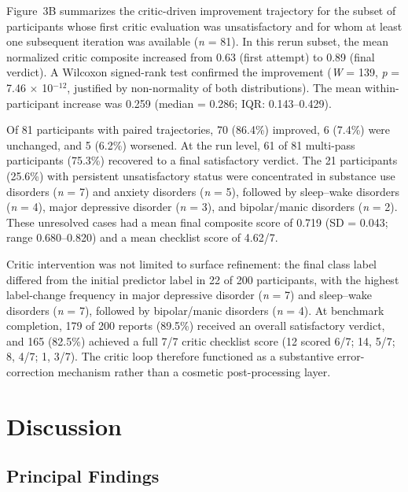 \documentclass[11pt,a4paper,twoside]{article}
\newcommand{\FloatBarrier}{\par}
\begin{document}
Figure~3B summarizes the critic-driven improvement trajectory for the subset of participants whose first critic evaluation was unsatisfactory and for whom at least one subsequent iteration was available (\textit{n} = 81). In this rerun subset, the mean normalized critic composite increased from 0.63 (first attempt) to 0.89 (final verdict). A Wilcoxon signed-rank test confirmed the improvement (\textit{W} = 139, \textit{p} = 7.46 $\times$ 10$^{-12}$, justified by non-normality of both distributions). The mean within-participant increase was 0.259 (median = 0.286; IQR: 0.143--0.429).

Of 81 participants with paired trajectories, 70 (86.4\%) improved, 6 (7.4\%) were unchanged, and 5 (6.2\%) worsened. At the run level, 61 of 81 multi-pass participants (75.3\%) recovered to a final satisfactory verdict. The 21 participants (25.6\%) with persistent unsatisfactory status were concentrated in substance use disorders (\textit{n} = 7) and anxiety disorders (\textit{n} = 5), followed by sleep--wake disorders (\textit{n} = 4), major depressive disorder (\textit{n} = 3), and bipolar/manic disorders (\textit{n} = 2). These unresolved cases had a mean final composite score of 0.719 (SD = 0.043; range 0.680--0.820) and a mean checklist score of 4.62/7.

Critic intervention was not limited to surface refinement: the final class label differed from the initial predictor label in 22 of 200 participants, with the highest label-change frequency in major depressive disorder (\textit{n} = 7) and sleep--wake disorders (\textit{n} = 7), followed by bipolar/manic disorders (\textit{n} = 4). At benchmark completion, 179 of 200 reports (89.5\%) received an overall satisfactory verdict, and 165 (82.5\%) achieved a full 7/7 critic checklist score (12 scored 6/7; 14, 5/7; 8, 4/7; 1, 3/7). The critic loop therefore functioned as a substantive error-correction mechanism rather than a cosmetic post-processing layer.

\FloatBarrier
\section{Discussion}

\subsection{Principal Findings}
\end{document}

